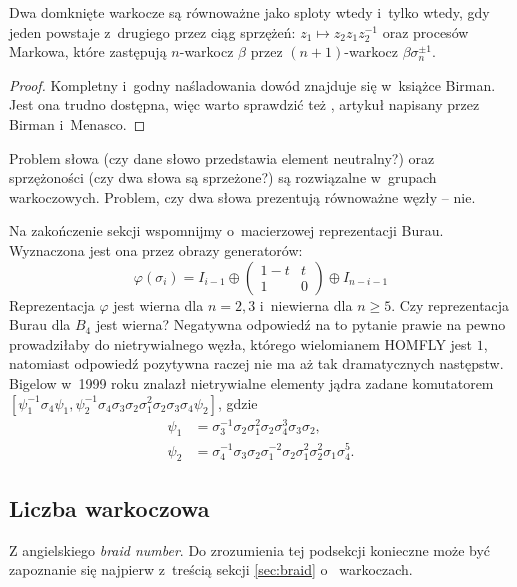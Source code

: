 \begin{theorem}[Markow, 1936]
    Dwa domknięte warkocze są równoważne jako sploty wtedy i~tylko wtedy,
    gdy jeden powstaje z~drugiego przez ciąg
    sprzężeń: $z_1 \mapsto z_2 z_1 z_2^{-1}$ oraz procesów Markowa,
    które zastępują $n$-warkocz $\beta$ przez $(n+1)$-warkocz $\beta\sigma_n^{\pm 1}$.
\end{theorem}

\begin{proof}
    Kompletny i~godny naśladowania dowód znajduje się w~książce \cite{birman74} Birman.
    Jest ona trudno dostępna, więc warto sprawdzić też \cite{birman02}, artykuł napisany przez Birman i~Menasco.
\end{proof}

Problem słowa (czy dane słowo przedstawia element neutralny?) oraz sprzężoności (czy dwa słowa są sprzeżone?) są rozwiązalne w~grupach warkoczowych.
Problem, czy dwa słowa prezentują równoważne węzły -- nie.

Na zakończenie sekcji wspomnijmy o~macierzowej reprezentacji Burau.
Wyznaczona jest ona przez obrazy generatorów:
\[
    \varphi(\sigma_i) = I_{i-1} \oplus \begin{pmatrix}
        1-t & t \\
        1   & 0
    \end{pmatrix} \oplus I_{n-i-1}
\]
Reprezentacja $\varphi$ jest wierna dla $n = 2, 3$ i~niewierna dla $n \ge 5$.
Czy reprezentacja Burau dla $B_4$ jest wierna?
Negatywna odpowiedź na to pytanie prawie na pewno prowadziłaby do
nietrywialnego węzła, którego wielomianem HOMFLY jest $1$,
natomiast odpowiedź pozytywna raczej nie ma aż tak dramatycznych następstw.
Bigelow w~1999 roku znalazł nietrywialne elementy jądra zadane komutatorem $[\psi_1^{{-1}}\sigma_4\psi_1,\psi_2^{{-1}}\sigma_4\sigma_3\sigma_2\sigma_1^2\sigma_2\sigma_3\sigma_4\psi_2]$, gdzie
    \begin{align*}
        \psi_1 & = \sigma_3^{{-1}}\sigma_2\sigma_1^2\sigma_2\sigma_4^3\sigma_3\sigma_2, \\
\psi_2 & = \sigma_4^{{-1}}\sigma_3\sigma_2\sigma_1^{{-2}}\sigma_2\sigma_1^2\sigma_2^2\sigma_1\sigma_4^5.
    \end{align*}

\subsection{Liczba warkoczowa} %
\label{sub:braid_number}
Z angielskiego \emph{braid number}.
Do zrozumienia tej podsekcji konieczne może być zapoznanie się najpierw z~treścią sekcji \ref{sec:braid} o~ warkoczach.

